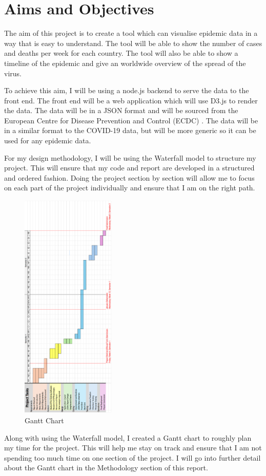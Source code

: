 \documentclass{report}
\begin{document}
\section{Aims and Objectives}
The aim of this project is to create a tool which can visualise epidemic data in a way that is easy to understand. The tool will be able to show the number of cases and deaths per week for each country. The tool will also be able to show a timeline of the epidemic and give an worldwide overview of the spread of the virus.

To achieve this aim, I will be using a node.js backend to serve the data to the front end. The front end will be a web application which will use D3.js to render the data. The data will be in a JSON format and will be sourced from the European Centre for Disease Prevention and Control (ECDC) \cite{ecdc}. The data will be in a similar format to the COVID-19 data, but will be more generic so it can be used for any epidemic data.

For my design methodology, I will be using the Waterfall model to structure my project. This will ensure that my code and report are developed in a structured and ordered fashion. Doing the project section by section will allow me to focus on each part of the project individually and ensure that I am on the right path.
\newpage
\begin{center}
    \begin{figure}[h]
        \centering
        \includegraphics[width=0.4\textwidth, angle=270]{gantt_chart}
        \caption{Gantt Chart}
        \label{fig:gantt_chart}
    \end{figure}
\end{center}
Along with using the Waterfall model, I created a Gantt chart to roughly plan my time for the project. This will help me stay on track and ensure that I am not spending too much time on one section of the project. I will go into further detail about the Gantt chart in the Methodology section of this report.
\end{document}
